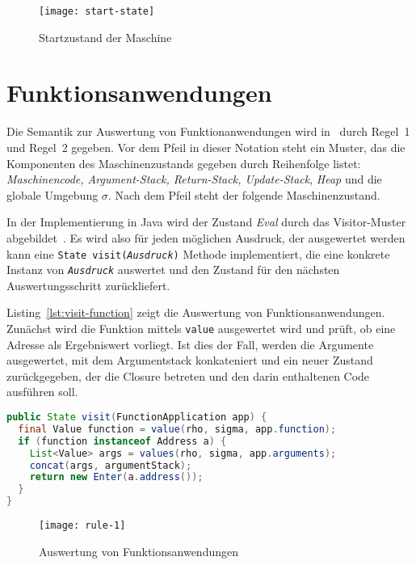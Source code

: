 \begin{figure}
  \centering
  \texttt{[image: start-state]}
  \caption{Startzustand der Maschine}\label{fig:start-state}
\end{figure}

\section{Funktionsanwendungen}\label{sec:function-applications}

Die Semantik zur Auswertung von Funktionanwendungen wird in~\cite{Jones_StockHardwareSTG} durch Regel~1 und Regel~2 gegeben.
Vor dem Pfeil in dieser Notation steht ein Muster, das die Komponenten des Maschinenzustands gegeben durch Reihenfolge listet: \textit{Maschinencode, Argument-Stack, Return-Stack, Update-Stack}, \textit{Heap} und die globale Umgebung $\sigma$.
Nach dem Pfeil steht der folgende Maschinenzustand.

In der Implementierung in Java wird der Zustand \textit{Eval} durch das Visitor-Muster abgebildet~\cite{Gamma_DesignPatterns}.
Es wird also für jeden möglichen Ausdruck, der ausgewertet werden kann eine \texttt{State visit(\textit{Ausdruck})} Methode implementiert, die eine konkrete Instanz von \texttt{\textit{Ausdruck}} auswertet und den Zustand für den nächsten Auswertungsschritt zurückliefert.

Listing~\ref{lst:visit-function} zeigt die Auswertung von Funktionsanwendungen.
Zunächst wird die Funktion mittels \texttt{value} ausgewertet wird und prüft, ob eine Adresse als Ergebniswert vorliegt.
Ist dies der Fall, werden die Argumente ausgewertet, mit dem Argumentstack konkateniert und ein neuer Zustand zurückgegeben, der die Closure betreten und den darin enthaltenen Code ausführen soll.

\begin{lstlisting}[language=java,caption={Auswertung von Funktionsanwendungen},label={lst:visit-function}]
public State visit(FunctionApplication app) {
  final Value function = value(rho, sigma, app.function);
  if (function instanceof Address a) {
    List<Value> args = values(rho, sigma, app.arguments);
    concat(args, argumentStack);
    return new Enter(a.address());
  }
}
\end{lstlisting}

\begin{figure}[h]
  \centering
  \texttt{[image: rule-1]}
  \caption{Auswertung von Funktionsanwendungen}\label{fig:rule-1}
\end{figure}


